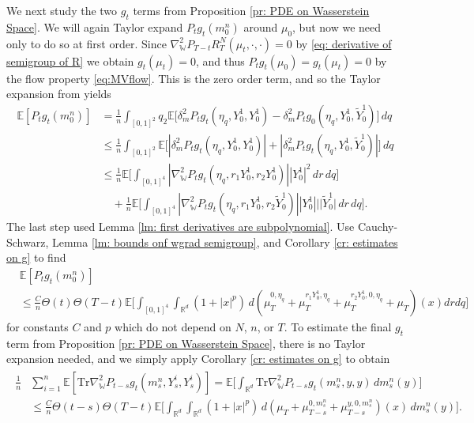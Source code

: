 \documentclass[11pt,reqno]{amsart}
\numberwithin{equation}{section}
\theoremstyle{definition}
\def\E{{\mathbb E}}
\def\R{{\mathbb R}}
\def\tr{\mathrm{Tr}}
\newcommand{\wgrad}{\nabla_{\W}}
\newcommand{\W}{\mathbb W}
\begin{document}
We next study the two $g_t$ terms from Proposition \ref{pr: PDE on Wasserstein Space}. We will again Taylor expand $P_tg_t(m^n_0)$ around $\mu_0$, but now we need only to do so at first order. Since $\wgrad^2 P_{T-t} R^N_T (\mu_t,\cdot,\cdot)=0$ by \ref{eq: derivative of semigroup of R} we obtain $g_t(\mu_t)=0$, and thus $P_tg_t(\mu_0)=g_t(\mu_t)=0$ by the flow property \eqref{eq:MVflow}. This is the zero order term, and so the Taylor expansion  from  \cite[Equation (2.25)]{Chassagneux2022-jt} yields
\begin{align}
    \E[P_t g_t(m_0^n)]&= \frac 1n \int_{[0,1]^2} q_2 \E\big[\delta_m^2 P_t g_t(\eta_{q},Y_0^1,Y^1_0)-\delta_m^2 P_t g_0(\eta_{q},Y^1_0,\widetilde{Y}_0^1)\big]\,dq  \nonumber  \\
    &\leq \frac 1n \int_{[0,1]^2}\E\big[|\delta_m^2 P_t g_t(\eta_{q},Y_0^1,Y_0^1)|+|\delta_m^2P_t g_t(\eta_{q},Y_0^1,\widetilde{Y}_0^1)|\big]\,dq \nonumber \\
    &\leq \frac{1}{n} \E \Big[\int_{[0,1]^4}|\wgrad^2 P_t g_t(\eta_{q},r_1Y_0^1,r_2 Y_0^1)||Y_0^1|^2\,dr\,dq\Big]  \nonumber \\
    &\quad +\frac{1}{n} \E \Big[\int_{[0,1]^4}|\wgrad^2 P_t g_t(\eta_{q},r_1Y_0^1,r_2 \widetilde{Y}_0^1)||Y_0^1||| \widetilde{Y}_0^1| \,dr\,dq\Big]. \label{eq: bound on g}
\end{align}
The last step used Lemma \ref{lm: first derivatives are subpolynomial}.
Use Cauchy-Schwarz, Lemma \ref{lm: bounds onf wgrad semigroup}, and Corollary \ref{cr: estimates on g} to find 
\begin{align*}
    &\E[P_tg_t(m_0^n)]\\
    &\leq 
    \frac{C}{n}\Theta(t)\Theta(T-t)  \E\Big[\int_{[0,1]^4}\int_{\R^d}(1+|x|^p)\,d(\mu_T^{0,\eta_q}+\mu_T^{r_1 Y_0^1,\eta_q}+\mu_T^{r_2Y_0^1,0,\eta_q}+\mu_T)(x)drdq\Big]
\end{align*}
for constants $C$ and $p$ which do not depend on $N$, $n$, or $T$.
To estimate the final $g_t$ term from Proposition \ref{pr: PDE on Wasserstein Space}, there is no Taylor expansion needed, and we simply apply Corollary \ref{cr: estimates on g} to obtain
\begin{align}
\begin{split}
    \label{eq: bound on wgrad g}
    \frac{1}{n} &\sum_{i=1}^n \E[\tr\wgrad^2 P_{t-s}g_t (m_s^n,Y_s^i,Y_s^i)]= \E\Big[\int_{\R^d}\tr\wgrad^2P_{t-s}g_t(m_s^n,y,y)\,dm_s^n(y)\Big]
    \\&\leq \frac {C}{n}\Theta(t-s)\Theta(T-t) \E\Big[\int_{\R^d} \int_{\R^d} (1+|x|^p)\,d(\mu_T + \mu_{T-s}^{0,m_s^n}+\mu_{T-s}^{y,0,m_s^n})(x)  \,dm_s^n(y)\Big].
\end{split}
\end{align}
\end{document}
